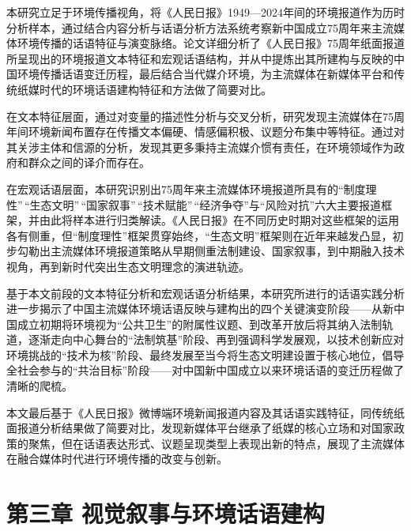 本研究立足于环境传播视角，将《人民日报》1949---2024年间的环境报道作为历时分析样本，通过结合内容分析与话语分析方法系统考察新中国成立75周年来主流媒体环境传播的话语特征与演变脉络。论文详细分析了《人民日报》75周年纸面报道所呈现出的环境报道文本特征和宏观话语结构，并从中提炼出其所建构与反映的中国环境传播话语变迁历程，最后结合当代媒介环境，为主流媒体在新媒体平台和传统纸媒时代的环境话语建构特征和方法做了简要对比。

在文本特征层面，通过对变量的描述性分析与交叉分析，研究发现主流媒体在75周年间环境新闻布置存在传播文本偏硬、情感偏积极、议题分布集中等特征。通过对其关涉主体和信源的分析，发现其更多秉持主流媒介惯有责任，在环境领域作为政府和群众之间的译介而存在。

在宏观话语层面，本研究识别出75周年来主流媒体环境报道所具有的``制度理性''\,``生态文明''\,``国家叙事''\,``技术赋能''\,``经济争夺''与``风险对抗''六大主要报道框架，并由此将样本进行归类解读。《人民日报》在不同历史时期对这些框架的运用各有侧重，但``制度理性''框架贯穿始终，``生态文明''框架则在近年来越发凸显，初步勾勒出主流媒体环境报道策略从早期侧重法制建设、国家叙事，到中期融入技术视角，再到新时代突出生态文明理念的演进轨迹。

基于本文前段的文本特征分析和宏观话语分析结果，本研究所进行的话语实践分析进一步揭示了中国主流媒体环境话语反映与建构出的四个关键演变阶段------从新中国成立初期将环境视为``公共卫生''的附属性议题、到改革开放后将其纳入法制轨道，逐渐走向中心舞台的``法制筑基''阶段、再到强调科学发展观，以技术创新应对环境挑战的``技术为核''阶段、最终发展至当今将生态文明建设置于核心地位，倡导全社会参与的``共治目标''阶段------对中国新中国成立以来环境话语的变迁历程做了清晰的爬梳。

本文最后基于《人民日报》微博端环境新闻报道内容及其话语实践特征，同传统纸面报道分析结果做了简要对比，发现新媒体平台继承了纸媒的核心立场和对国家政策的聚焦，但在话语表达形式、议题呈现类型上表现出新的特点，展现了主流媒体在融合媒体时代进行环境传播的改变与创新。

\section{第三章
视觉叙事与环境话语建构}\label{ux7b2cux4e09ux7ae0-ux89c6ux89c9ux53d9ux4e8bux4e0eux73afux5883ux8bddux8bedux5efaux6784}

